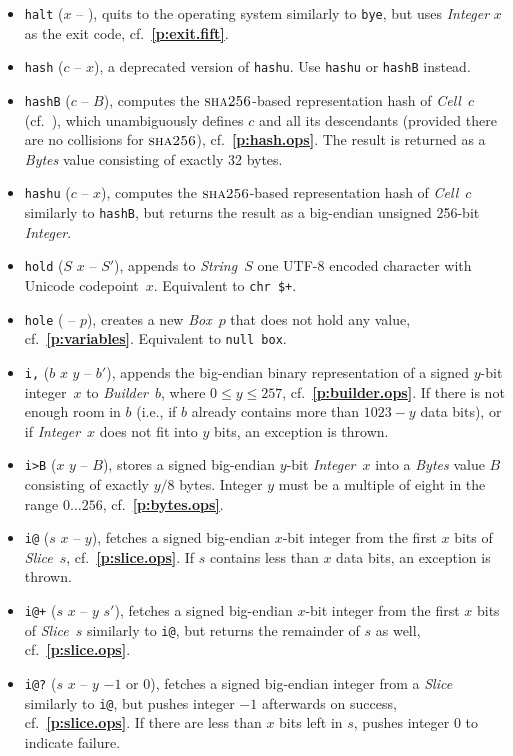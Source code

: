 \documentclass[12pt,oneside]{article}
\def\refpoint#1{{\rm\textbf{\ref{#1}}}}
\let\ptref=\refpoint
\def\opsc#1{\operatorname{\textsc{#1}}}
\def\Sha{\opsc{sha256}}
\begin{document}
\begin{itemize}
\item {\tt halt} ($x$ -- ), quits to the operating system similarly to {\tt bye}, but uses {\em Integer\/} $x$ as the exit code, cf.~\ptref{p:exit.fift}.
\item {\tt hash} ($c$ -- $x$), a deprecated version of {\tt hashu}. Use {\tt hashu} or {\tt hashB} instead. 
\item {\tt hashB} ($c$ -- $B$), computes the $\Sha$-based representation hash of {\em Cell\/}~$c$ (cf.~\cite[3.1]{TVM}), which unambiguously defines $c$ and all its descendants (provided there are no collisions for $\Sha$), cf.~\ptref{p:hash.ops}. The result is returned as a {\em Bytes\/} value consisting of exactly 32 bytes.
\item {\tt hashu} ($c$ -- $x$), computes the $\Sha$-based representation hash of {\em Cell\/}~$c$ similarly to {\tt hashB}, but returns the result as a big-endian unsigned 256-bit {\em Integer}.
\item {\tt hold} ($S$ $x$ -- $S'$), appends to {\em String\/}~$S$ one UTF-8 encoded character with Unicode codepoint~$x$. Equivalent to {\tt chr \$+}.
\item {\tt hole} ( -- $p$), creates a new {\em Box\/}~$p$ that does not hold any value, cf.~\ptref{p:variables}. Equivalent to {\tt null box}.
\item {\tt i,} ($b$ $x$ $y$ -- $b'$), appends the big-endian binary representation of a signed $y$-bit integer~$x$ to {\em Builder\/}~$b$, where $0\leq y\leq 257$, cf.~\ptref{p:builder.ops}. If there is not enough room in $b$ (i.e., if $b$ already contains more than $1023-y$ data bits), or if {\em Integer\/}~$x$ does not fit into $y$ bits, an exception is thrown.
\item {\tt i>B} ($x$ $y$ -- $B$), stores a signed big-endian $y$-bit {\em Integer\/}~$x$ into a {\em Bytes\/} value $B$ consisting of exactly $y/8$ bytes. Integer $y$ must be a multiple of eight in the range $0\ldots256$, cf.~\ptref{p:bytes.ops}.
\item {\tt i@} ($s$ $x$ -- $y$), fetches a signed big-endian $x$-bit integer from the first $x$ bits of {\em Slice}~$s$, cf.~\ptref{p:slice.ops}. If $s$ contains less than $x$ data bits, an exception is thrown.
\item {\tt i@+} ($s$ $x$ -- $y$ $s'$), fetches a signed big-endian $x$-bit integer from the first $x$ bits of {\em Slice}~$s$ similarly to {\tt i@}, but returns the remainder of $s$ as well, cf.~\ptref{p:slice.ops}.
\item {\tt i@?} ($s$ $x$ -- $y$ $-1$ or $0$), fetches a signed big-endian integer from a {\em Slice\/} similarly to {\tt i@}, but pushes integer $-1$ afterwards on success, cf.~\ptref{p:slice.ops}. If there are less than $x$ bits left in $s$, pushes integer $0$ to indicate failure.

\end{itemize}
\end{document}
